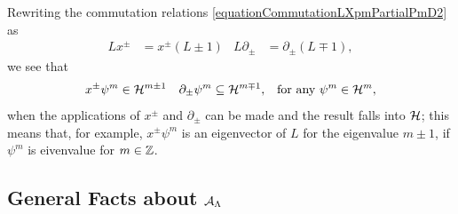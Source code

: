 Rewriting the commutation relations \eqref{equationCommutationLXpmPartialPmD2} as
\begin{align}\label{equationCommutatorRewrittenXPMIncreasesDecreasesDegreesD2Hilbert}
L x^\pm &= x^\pm(L \pm 1) &  L \partial_\pm &= \partial_\pm (L \mp 1),
\end{align}
we see that
\begin{align}\label{equationX+XPlusIncreasesDecreasesDegreeEigenvalueL}
    x^\pm \psi^m &\in \mathcal H^{m \pm 1} & \partial_\pm \psi^{m} &\subseteq \mathcal H^{m \mp 1}, & \text{for any }\psi^m \in \mathcal H^m,
\end{align}
when the applications of $x^\pm$ and $\partial_\pm$ can be made and the result falls into $\mathcal H$; this means that, for example, $x^\pm \psi^m$ is an eigenvector of $L$ for the eigenvalue $m \pm 1$, if $\psi^m$ is eivenvalue for $m \in \mathbb{Z}$.



\subsection{General Facts about $\mathcal A_{\Lambda}$}

